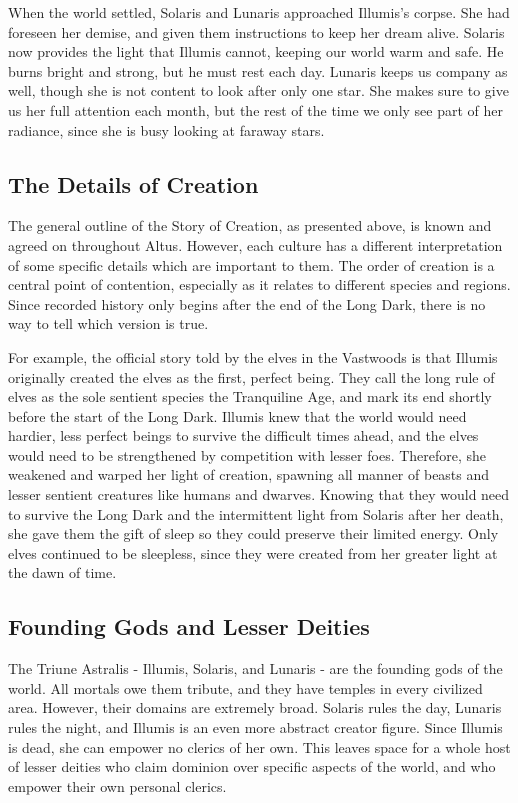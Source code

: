   When the world settled, Solaris and Lunaris approached Illumis's corpse.
  She had foreseen her demise, and given them instructions to keep her dream alive.
  Solaris now provides the light that Illumis cannot, keeping our world warm and safe.
  He burns bright and strong, but he must rest each day.
  Lunaris keeps us company as well, though she is not content to look after only one star.
  She makes sure to give us her full attention each month, but the rest of the time we only see part of her radiance, since she is busy looking at faraway stars.

  \subsection{The Details of Creation}

    The general outline of the Story of Creation, as presented above, is known and agreed on throughout Altus.
    However, each culture has a different interpretation of some specific details which are important to them.
    The order of creation is a central point of contention, especially as it relates to different species and regions.
    Since recorded history only begins after the end of the Long Dark, there is no way to tell which version is true.

    For example, the official story told by the elves in the Vastwoods is that Illumis originally created the elves as the first, perfect being.
    They call the long rule of elves as the sole sentient species the Tranquiline Age, and mark its end shortly before the start of the Long Dark.
    Illumis knew that the world would need hardier, less perfect beings to survive the difficult times ahead, and the elves would need to be strengthened by competition with lesser foes.
    Therefore, she weakened and warped her light of creation, spawning all manner of beasts and lesser sentient creatures like humans and dwarves.
    Knowing that they would need to survive the Long Dark and the intermittent light from Solaris after her death, she gave them the gift of sleep so they could preserve their limited energy.
    Only elves continued to be sleepless, since they were created from her greater light at the dawn of time.

  \subsection{Founding Gods and Lesser Deities}
    The Triune Astralis - Illumis, Solaris, and Lunaris - are the founding gods of the world.
    All mortals owe them tribute, and they have temples in every civilized area.
    However, their domains are extremely broad.
    Solaris rules the day, Lunaris rules the night, and Illumis is an even more abstract creator figure.
    Since Illumis is dead, she can empower no clerics of her own.
    This leaves space for a whole host of lesser deities who claim dominion over specific aspects of the world, and who empower their own personal clerics.

